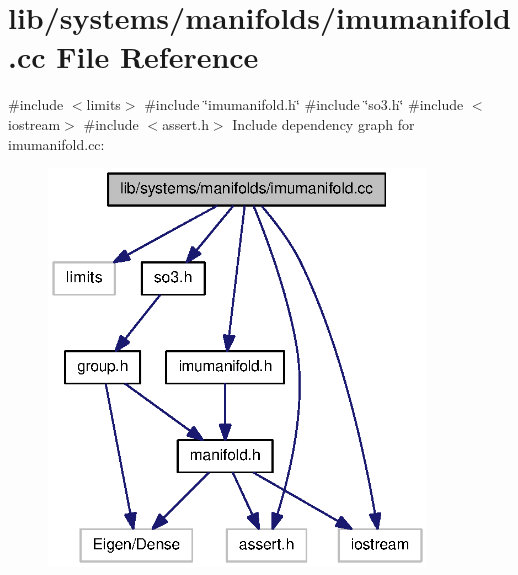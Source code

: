 \section{lib/systems/manifolds/imumanifold.cc \-File \-Reference}
\label{imumanifold_8cc}
{\ttfamily \#include $<$limits$>$}\*
{\ttfamily \#include \char`\"{}imumanifold.\-h\char`\"{}}\*
{\ttfamily \#include \char`\"{}so3.\-h\char`\"{}}\*
{\ttfamily \#include $<$iostream$>$}\*
{\ttfamily \#include $<$assert.\-h$>$}\*
\-Include dependency graph for imumanifold.\-cc\-:\nopagebreak
\begin{figure}[H]
\begin{center}
\leavevmode
\includegraphics[width=284pt]{imumanifold_8cc__incl}
\end{center}
\end{figure}
